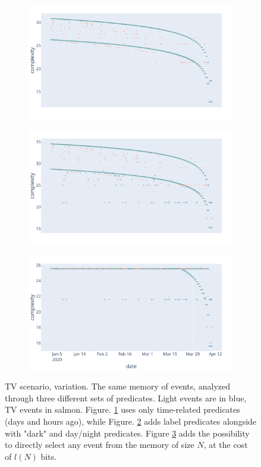 \documentclass[entropy,article,submit,moreauthors,pdftex]{Definitions/mdpi}
\begin{document}
\begin{figure}[!ht]
    \centering
    \begin{subfigure}{\linewidth}
        \centering
        \includegraphics[width=.7\linewidth]{figures/preds_1.png}
        \caption{}
        \label{fig:pred_1}
    \end{subfigure}
    \begin{subfigure}{\linewidth}
        \centering
        \includegraphics[width=.7\linewidth]{figures/preds_2.png}
        \caption{}
        \label{fig:pred_2}
    \end{subfigure}
    \begin{subfigure}{\linewidth}
        \centering
        \includegraphics[width=.7\linewidth]{figures/preds_3.png}
        \caption{}
        \label{fig:pred_3}
    \end{subfigure}
    \caption{TV scenario, variation. The same memory of events, analyzed through three different sets of predicates. Light events are in blue, TV events in salmon. Figure. \ref{fig:pred_1} uses only time-related predicates (days and hours ago), while Figure. \ref{fig:pred_2} adds label predicates alongside with "dark" and day/night predicates. Figure \ref{fig:pred_3} adds the possibility to directly select any event from the memory of size $N$, at the cost of $l(N)$ bits.}
    \label{fig:3preds}
\end{figure}
\end{document}
